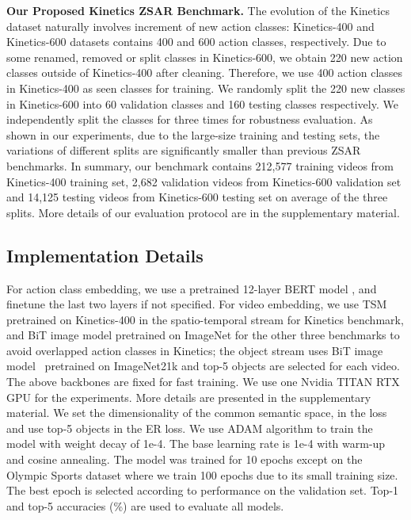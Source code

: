 \vspace{0.2em}
\noindent\textbf{Our Proposed Kinetics ZSAR Benchmark.}
The evolution of the Kinetics dataset \cite{carreira2018short,carreira2017quo} naturally involves increment of new action classes: Kinetics-400 and Kinetics-600 datasets contains 400 and 600 action classes, respectively. Due to some renamed, removed or split classes in Kinetics-600, we obtain 220 new action classes outside of Kinetics-400 after cleaning.
Therefore, we use 400 action classes in Kinetics-400 as seen classes for training. We randomly split the 220 new classes in Kinetics-600 into 60 validation classes and 160 testing classes respectively.
We independently split the classes for three times for robustness evaluation. 
As shown in our experiments, due to the large-size training and testing sets, the variations of different splits are significantly smaller than previous ZSAR benchmarks. In summary, our benchmark contains 212,577 training videos from Kinetics-400 training set, 2,682 validation videos from Kinetics-600 validation set and 14,125 testing videos from Kinetics-600 testing set on average of the three splits.
More details of our evaluation protocol are in the supplementary material.

\subsection{Implementation Details}
For action class embedding, we use a pretrained 12-layer BERT model \cite{devlin2018bert}, and finetune the last two layers if not specified.
For video embedding, we use TSM \cite{lin2019tsm} pretrained on Kinetics-400 in the spatio-temporal stream for Kinetics benchmark, and BiT image model \cite{kolesnikov2019big} pretrained on ImageNet for the other three benchmarks to avoid overlapped action classes in Kinetics; the object stream uses BiT image model~\cite{kolesnikov2019big} pretrained on ImageNet21k \cite{deng2009imagenet} and top-5 objects are selected for each video.
The above backbones are fixed for fast training.
We use one Nvidia TITAN RTX GPU for the experiments.
More details are presented in the supplementary material.
We set the dimensionality  of the common semantic space,  in the loss and use top-5 objects in the ER loss.
We use ADAM algorithm to train the model with weight decay of 1e-4. The base learning rate is 1e-4  with warm-up and cosine annealing. The model was trained for 10 epochs except on the Olympic Sports dataset where we train 100 epochs due to its small training size. The best epoch is selected according to performance on the validation set.
Top-1 and top-5 accuracies (\%) are used to evaluate all models.

